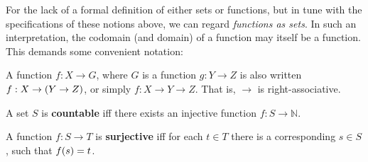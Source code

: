 
For the lack of a formal definition of either sets or functions, but in tune
with the specifications of these notions above, we can regard \emph{functions
as sets}. In such an interpretation, the codomain (and domain) of a function
may itself be a function. This demands some convenient notation:

\begin{notation} A function $f:X\rightarrow G$, where $G$ is a function
$g:Y\rightarrow Z$ is also written $f:X\rightarrow \mathopen{}\left({Y\rightarrow Z}\right)\mathclose{}$, or
simply $f:X\rightarrow Y\rightarrow Z$. That is, $\rightarrow$ is
right-associative. \end{notation}









\begin{definition} \label{def:countable} A set $S$ is \textbf{countable} iff
there exists an injective function $f : S \rightarrow \mathbb{N}$.
\end{definition}

\begin{definition} \label{def:surjective} A function $f:S\rightarrow T$ is
\textbf{surjective} iff for each $t\in T$ there is a corresponding $s\in S$,
such that $f\mathopen{}\left({s}\right)\mathclose{}=t$.  \end{definition}

